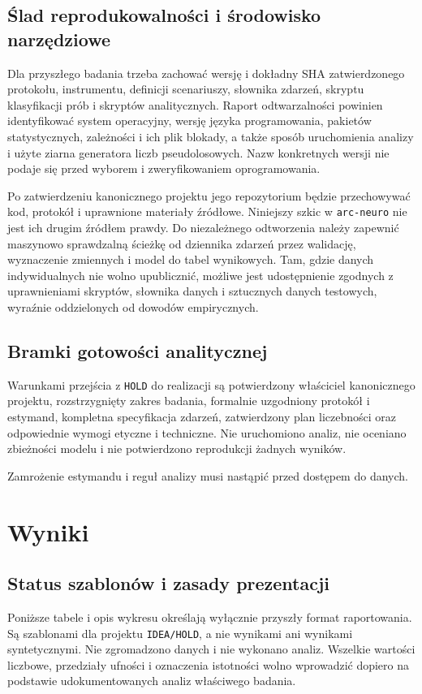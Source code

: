 \documentclass[11pt,a4paper]{article}
\begin{document}
\subsection{Ślad reprodukowalności i środowisko narzędziowe}
Dla przyszłego badania trzeba zachować wersję i dokładny SHA zatwierdzonego protokołu, instrumentu, definicji scenariuszy, słownika zdarzeń, skryptu klasyfikacji prób i skryptów analitycznych. Raport odtwarzalności powinien identyfikować system operacyjny, wersję języka programowania, pakietów statystycznych, zależności i ich plik blokady, a także sposób uruchomienia analizy i użyte ziarna generatora liczb pseudolosowych. Nazw konkretnych wersji nie podaje się przed wyborem i zweryfikowaniem oprogramowania.

Po zatwierdzeniu kanonicznego projektu jego repozytorium będzie przechowywać kod, protokół i uprawnione materiały źródłowe. Niniejszy szkic w \texttt{arc-neuro} nie jest ich drugim źródłem prawdy. Do niezależnego odtworzenia należy zapewnić maszynowo sprawdzalną ścieżkę od dziennika zdarzeń przez walidację, wyznaczenie zmiennych i model do tabel wynikowych. Tam, gdzie danych indywidualnych nie wolno upublicznić, możliwe jest udostępnienie zgodnych z uprawnieniami skryptów, słownika danych i sztucznych danych testowych, wyraźnie oddzielonych od dowodów empirycznych.

\subsection{Bramki gotowości analitycznej}
Warunkami przejścia z \texttt{HOLD} do realizacji są potwierdzony właściciel kanonicznego projektu, rozstrzygnięty zakres badania, formalnie uzgodniony protokół i estymand, kompletna specyfikacja zdarzeń, zatwierdzony plan liczebności oraz odpowiednie wymogi etyczne i techniczne. Nie uruchomiono analiz, nie oceniano zbieżności modelu i nie potwierdzono reprodukcji żadnych wyników.

Zamrożenie estymandu i reguł analizy musi nastąpić przed dostępem do danych.

\section{Wyniki}
\subsection{Status szablonów i zasady prezentacji}
Poniższe tabele i opis wykresu określają wyłącznie przyszły format raportowania. Są szablonami dla projektu \texttt{IDEA/HOLD}, a nie wynikami ani wynikami syntetycznymi. Nie zgromadzono danych i nie wykonano analiz. Wszelkie wartości liczbowe, przedziały ufności i oznaczenia istotności wolno wprowadzić dopiero na podstawie udokumentowanych analiz właściwego badania.
\end{document}
